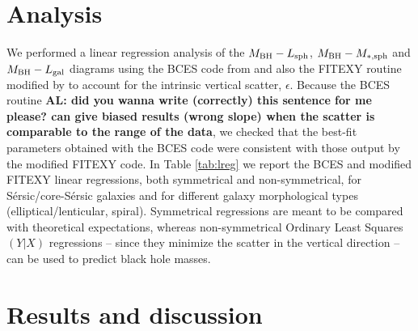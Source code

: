 \documentclass[preprint2]{emulateapj}
\begin{document}
\section{Analysis}
\label{sec:anal}
We performed a linear regression analysis of the $M_{\rm BH} - L_{\rm sph}$, $M_{\rm BH} - M_{\rm *,sph}$ and $M_{\rm BH} - L_{\rm gal}$ diagrams 
using the BCES code from \cite{akritasbershady1996} 
and also the FITEXY routine \citep{press1992} 
modified by \cite{tremaine2002} to account for the intrinsic vertical scatter, $\epsilon$. 
Because the BCES routine {\bf AL: did you wanna write (correctly) this sentence for me please? 
can give biased results (wrong slope) when the scatter is comparable to the range of the data},
we checked that the best-fit parameters obtained with the BCES code were consistent with those output by the modified FITEXY code.
In Table \ref{tab:lreg} we report the BCES and modified FITEXY linear regressions, both symmetrical and non-symmetrical, 
for S\'ersic/core-S\'ersic galaxies and for different galaxy morphological types (elliptical/lenticular, spiral).
Symmetrical regressions are meant to be compared with theoretical expectations, 
whereas non-symmetrical Ordinary Least Squares $(Y|X)$ regressions -- 
since they minimize the scatter in the vertical direction -- 
can be used to predict black hole masses.

\section{Results and discussion}
\label{sec:res}
\end{document}
